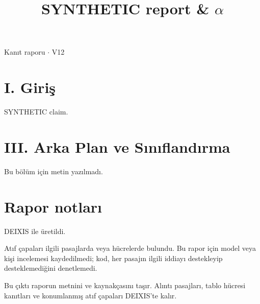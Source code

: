\documentclass[journal]{IEEEtran}
\begin{document}
\renewcommand{\abstractname}{Özet}
\renewcommand{\IEEEkeywordsname}{Dizin Terimleri}
\renewcommand{\refname}{Kaynaklar}

\title{SYNTHETIC report \& \ensuremath{\alpha}}

\maketitle

\noindent Kanıt raporu \ensuremath{\cdot} V12

\section*{I. Giriş}

SYNTHETIC claim. \cite{Synth26}

\section*{III. Arka Plan ve Sınıflandırma}

Bu bölüm için metin yazılmadı.

\section*{Rapor notları}

DEIXIS ile üretildi.

Atıf çapaları ilgili pasajlarda veya hücrelerde bulundu. Bu rapor için model veya kişi incelemesi kaydedilmedi; kod, her pasajın ilgili iddiayı destekleyip desteklemediğini denetlemedi.

Bu çıktı raporun metnini ve kaynakçasını taşır. Alıntı pasajları, tablo hücresi kanıtları ve konumlanmış atıf çapaları DEIXIS'te kalır.




\end{document}
